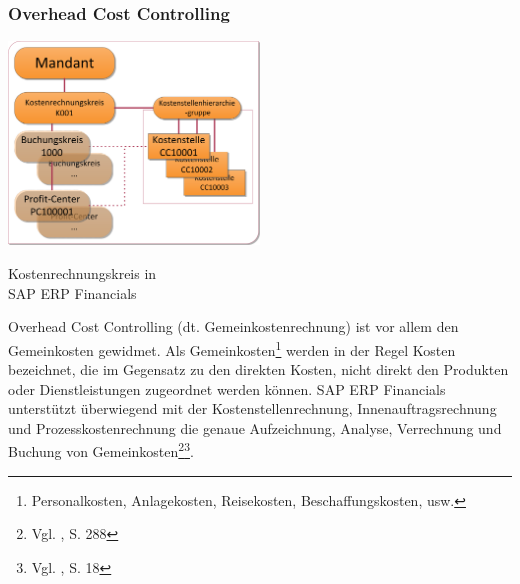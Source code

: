\subsubsection{Overhead Cost Controlling}
\begin{floatingfigure}[htbpr]{0.5\textwidth} 
\includegraphics[width=0.5\textwidth]{Images/kostenRechnungskreis.png}
\begin{flushright}
   \caption[Kostenrechnungskreis in SAP ERP Financials]{Kostenrechnungskreis in \\SAP ERP Financials}\label{abb4}
\end{flushright}
\end{floatingfigure}\noindent
Overhead Cost Controlling (dt. Gemeinkostenrechnung) ist vor allem den Gemeinkosten gewidmet. Als Gemeinkosten\footnote{Personalkosten, Anlagekosten, Reisekosten, Beschaffungskosten, usw.} werden in der Regel Kosten bezeichnet, die im Gegensatz zu den direkten Kosten, nicht direkt den Produkten oder Dienstleistungen zugeordnet werden können. SAP ERP Financials unterstützt überwiegend mit der Kostenstellenrechnung, Innenauftragsrechnung und Prozesskostenrechnung die genaue Aufzeichnung, Analyse, Verrechnung und Buchung von Gemeinkosten\footnote{Vgl. \cite{Patel2009}, S. 288}\footnote{Vgl. \cite{SAPCOOMCCA2001}, S. 18}. 

